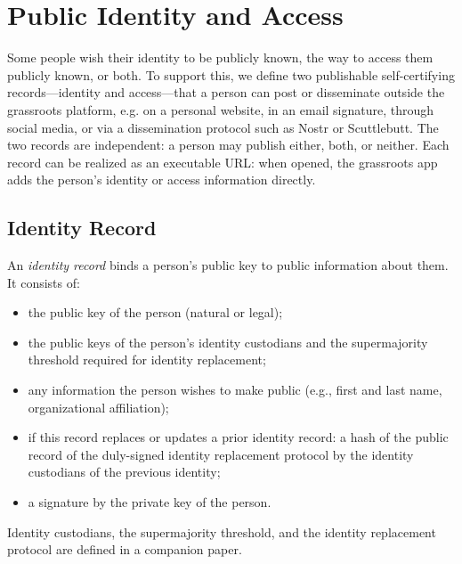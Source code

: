 \section{Public Identity and Access}
\label{sec:public-identity}
Some people wish their identity to be publicly known, the way to access them publicly known, or both. To support this, we define two publishable self-certifying records---identity and access---that a person can post or disseminate outside the grassroots platform, e.g. on a personal website, in an email signature, through social media, or via a dissemination protocol such as Nostr or Scuttlebutt.
The two records are independent: a person may publish either, both, or neither.  Each record can be realized as an executable URL: when opened, the grassroots app adds the person's identity or access information directly.

 
\subsection{Identity Record}
\label{sec:identity-record}
An \emph{identity record} binds a person's public key to public information about them.  It consists of:
\begin{itemize}
\item the public key of the person (natural or legal);
\item the public keys of the person's identity custodians and the supermajority threshold required for identity replacement;
\item any information the person wishes to make public (e.g., first and last name, organizational affiliation);
\item if this record replaces or updates a prior identity record: a hash of the public record of the duly-signed identity replacement protocol by the identity custodians of the previous identity;
\item a signature by the private key of the person.
\end{itemize}

Identity custodians, the supermajority threshold, and the identity replacement protocol are defined in a companion paper.%

